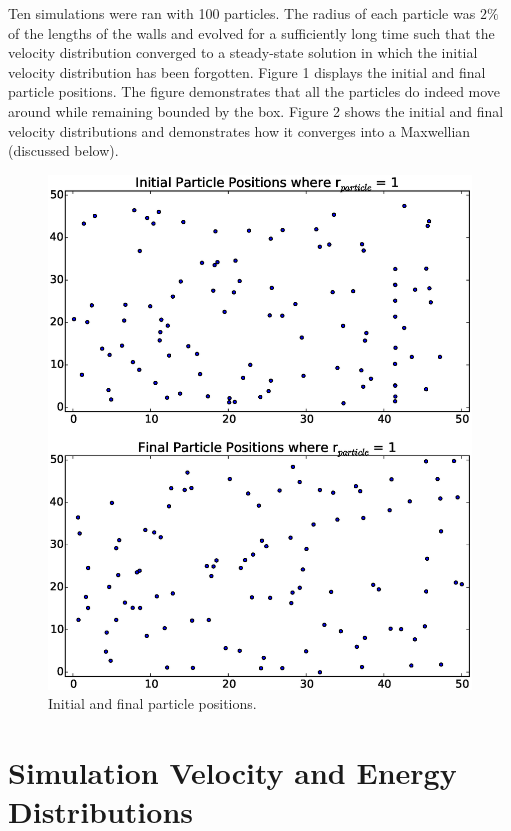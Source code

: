 \documentclass[12pt]{amsart}
\begin{document}
Ten simulations were ran with 100 particles.  The radius of each particle was $2 \%$ of the lengths of the walls and evolved for a sufficiently long time such that the velocity distribution converged to a steady-state solution in which the initial velocity distribution has been forgotten.  Figure 1 displays the initial and final particle positions.  The figure demonstrates that all the particles do indeed move around while remaining bounded by the box.  Figure 2 shows the initial and final velocity distributions and demonstrates how it converges into a Maxwellian (discussed below).
\begin{figure}[h!]
  \centering
    \includegraphics[width=1.0\textwidth]{pos_dist.eps}
    \caption{Initial and final particle positions.}
\end{figure}


\section{Simulation Velocity and Energy Distributions}
\end{document}
